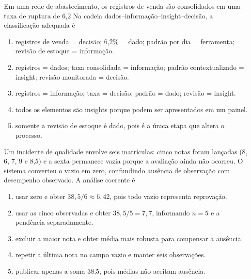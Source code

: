 \TextoBase Em uma rede de abastecimento, os registros de venda são consolidados em uma taxa de ruptura de 6,2%
\FonteDidatica
\Comando Na cadeia dados--informação--insight--decisão, a classificação adequada é
\begin{enumerate}[label=\Alph*)]
\item registros de venda = decisão; 6,2\% = dado; padrão por dia = ferramenta; revisão de estoque = informação.
\item registros = dados; taxa consolidada = informação; padrão contextualizado = insight; revisão monitorada = decisão.
\item registros = informação; taxa = decisão; padrão = dado; revisão = insight.
\item todos os elementos são insights porque podem ser apresentados em um painel.
\item somente a revisão de estoque é dado, pois é a única etapa que altera o processo.
\end{enumerate}
\TextoBase Um incidente de qualidade envolve seis matrículas: cinco notas foram lançadas (8, 6, 7, 9 e 8,5) e a sexta permanece vazia porque a avaliação ainda não ocorreu. O sistema converteu o vazio em zero, confundindo ausência de observação com desempenho observado.
\FonteDidatica
\Comando A análise coerente é
\begin{enumerate}[label=\Alph*)]
\item usar zero e obter $38{,}5/6\approx6{,}42$, pois todo vazio representa reprovação.
\item usar as cinco observadas e obter $38{,}5/5=7{,}7$, informando $n=5$ e a pendência separadamente.
\item excluir a maior nota e obter média mais robusta para compensar a ausência.
\item repetir a última nota no campo vazio e manter seis observações.
\item publicar apenas a soma 38,5, pois médias não aceitam ausência.
\end{enumerate}

